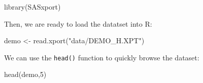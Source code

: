 \documentclass[
]{book}
\newenvironment{Shaded}{\begin{snugshade}}{\end{snugshade}}
\newcommand{\DecValTok}[1]{\textcolor[rgb]{0.00,0.00,0.81}{#1}}
\newcommand{\FunctionTok}[1]{\textcolor[rgb]{0.00,0.00,0.00}{#1}}
\newcommand{\NormalTok}[1]{#1}
\newcommand{\OtherTok}[1]{\textcolor[rgb]{0.56,0.35,0.01}{#1}}
\newcommand{\StringTok}[1]{\textcolor[rgb]{0.31,0.60,0.02}{#1}}
\begin{document}
\begin{Shaded}
\begin{Highlighting}[]
\FunctionTok{library}\NormalTok{(SASxport)}
\end{Highlighting}
\end{Shaded}

Then, we are ready to load the datatset into R:

\begin{Shaded}
\begin{Highlighting}[]
\NormalTok{demo }\OtherTok{\textless{}{-}} \FunctionTok{read.xport}\NormalTok{(}\StringTok{"data/DEMO\_H.XPT"}\NormalTok{)}
\end{Highlighting}
\end{Shaded}

We can use the \texttt{head()} function to quickly browse the dataset:

\begin{Shaded}
\begin{Highlighting}[]
\FunctionTok{head}\NormalTok{(demo,}\DecValTok{5}\NormalTok{)}
\end{Highlighting}
\end{Shaded}
\end{document}

